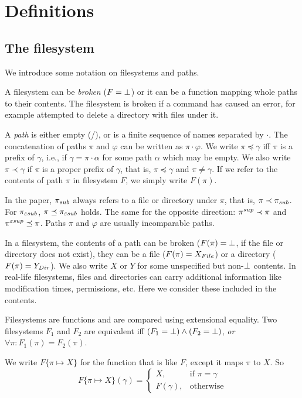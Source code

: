 \section{Definitions}
\label{theorem:def}
\subsection{The filesystem}
We introduce some notation on filesystems and paths.

A filesystem can be \emph{broken} (\(F=\bot\))
or it can be a function mapping whole paths to their
contents. The filesystem is broken if a command has caused an error, for
example attempted to delete a directory with files under it.

A \emph{path} is either empty (/), or is a finite sequence of names
separated by \(\cdot\). The concatenation of paths \(\pi\) and
\(\varphi\) can be written as \(\pi\cdot\varphi\).
We write
\(\pi\preceq\gamma\) iff \(\pi\) is a prefix of \(\gamma\), i.e., if
\(\gamma=\pi\cdot\alpha\) for some path \(\alpha\) which may be
empty. We also write
\(\pi\prec\gamma\) if \(\pi\) is a proper prefix of \(\gamma\), that is,
\(\pi\preceq\gamma\) and \(\pi\ne\gamma\). If we refer to the contents of
path \(\pi\) in filesystem \(F\), we simply write \(F(\pi)\).

In the paper, \(\pi_{sub}\) always refers to a file or directory under
\(\pi\), that is, \(\pi\prec\pi_{sub}\). For \(\pi_{\varepsilon sub}\),
\(\pi\preceq\pi_{\varepsilon sub}\) holds. The same for the opposite direction:
\(\pi^{sup}\prec\pi\) and \(\pi^{\varepsilon sup}\preceq\pi\). Paths \(\pi\) and
\(\varphi\) are usually incomparable paths.

In a filesystem, the contents of a path can be broken (\(F(\pi)=\bot\),
if the file or directory does not exist), they can be
a file (\(F(\pi)=X_{File}\)) or a directory (\(F(\pi)=Y_{Dir}\)).  
We also write \(X\) or \(Y\) for some unspecified but non-\(\bot\)
contents.
In real-life filesystems, files and directories can carry additional information
like modification times, permissions, etc.
Here we consider these included in the contents. 

Filesystems are functions and are compared using extensional equality.
Two filesystems \(F_1\) and \(F_2\) are equivalent iff
\((F_1=\bot)\wedge(F_2=\bot)\),
\emph{or} \(\forall\pi: F_1(\pi)=F_2(\pi)\).

We write \(F\{\pi \mapsto X\}\) for the function that is like \(F\),
except it maps \(\pi\) to \(X\).
So
\[F\{\pi \mapsto X\}(\gamma)=
\begin{cases}
X,&\mbox{if $\pi=\gamma$}\\
F(\gamma), &\mbox{otherwise}
\end{cases}\]

